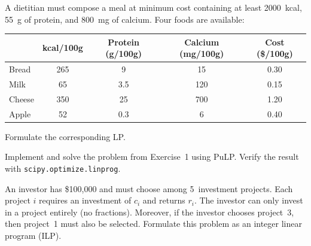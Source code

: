 \begin{exercise}
A dietitian must compose a meal at minimum cost containing at least
2000~kcal, 55~g of protein, and 800~mg of calcium.  Four foods are available:

\begin{center}
\begin{tabular}{lcccc}
  \toprule
  & kcal/100g & Protein (g/100g) & Calcium (mg/100g) & Cost (\$/100g) \\
  \midrule
  Bread & 265 & 9 & 15 & 0.30 \\
  Milk & 65 & 3.5 & 120 & 0.15 \\
  Cheese & 350 & 25 & 700 & 1.20 \\
  Apple & 52 & 0.3 & 6 & 0.40 \\
  \bottomrule
\end{tabular}
\end{center}

Formulate the corresponding LP.
\end{exercise}

\begin{exercise}
Implement and solve the problem from Exercise~1 using PuLP.
Verify the result with \texttt{scipy.optimize.linprog}.
\end{exercise}

\begin{exercise}
An investor has \$100{,}000 and must choose among 5~investment projects.
Each project $i$ requires an investment of $c_i$ and returns $r_i$.  The
investor can only invest in a project entirely (no fractions).  Moreover, if
the investor chooses project~3, then project~1 must also be selected.
Formulate this problem as an integer linear program (ILP).
\end{exercise}
